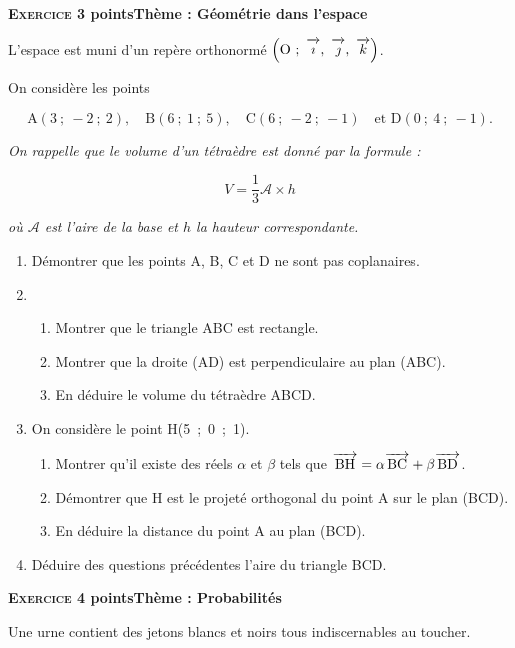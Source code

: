 \documentclass[10pt,a4paper]{article}
\newcommand{\vect}[1]{\overrightarrow{\,\mathstrut#1\,}}
\def\Oijk{$\left(\text{O}~;~\vect{\imath},~\vect{\jmath},~\vect{k}\right)$}
\begin{document}
\bigskip

\textbf{\textsc{Exercice 3}  points\hfill Thème : Géométrie dans l'espace}

\medskip

L'espace est muni d'un repère orthonormé \Oijk.

On considère les points 

\[\text{A}(3~;~-2~;~2),\quad \text{B}(6~;~1~;~5),\quad \text{C}(6~;~-2~;~-1)\quad \text{et D}(0~;~4~;~-1).\]

\emph{On rappelle que le volume d'un tétraèdre est donné par la formule :}

\[V = \dfrac13 \mathcal{A} \times h\]

\emph{où $\mathcal{A}$ est l'aire de la base et $h$ la hauteur correspondante.}

\medskip

\begin{enumerate}
\item Démontrer que les points A, B, C et D ne sont pas coplanaires.
\item 
	\begin{enumerate}
		\item Montrer que le triangle ABC est rectangle.
		\item Montrer que la droite (AD) est perpendiculaire au plan (ABC).
		\item En déduire le volume du tétraèdre ABCD.
	\end{enumerate}	
\item On considère le point H(5~;~0~;~1).
	\begin{enumerate}
		\item Montrer qu'il existe des réels $\alpha$ et $\beta$ tels que $\vect{\text{BH}} = \alpha \vect{\text{BC}} + \beta \vect{\text{BD}}$.
		\item Démontrer que H est le projeté orthogonal du point A sur le plan (BCD). 
		\item En déduire la distance du point A au plan (BCD).
	\end{enumerate}	
\item Déduire des questions précédentes l'aire du triangle BCD.
\end{enumerate}

\bigskip

\textbf{\textsc{Exercice 4}  points\hfill Thème : Probabilités}

\medskip

Une urne contient des jetons blancs et noirs tous indiscernables au toucher.
\end{document}
